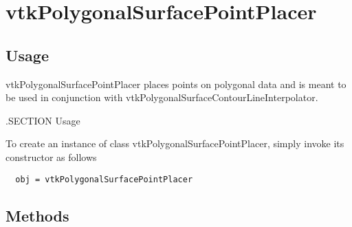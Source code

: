 \section{vtkPolygonalSurfacePointPlacer}

\subsection{Usage}

 vtkPolygonalSurfacePointPlacer places points on polygonal data and is
 meant to be used in conjunction with 
 vtkPolygonalSurfaceContourLineInterpolator.

 .SECTION Usage


To create an instance of class vtkPolygonalSurfacePointPlacer, simply
invoke its constructor as follows
\begin{verbatim}
  obj = vtkPolygonalSurfacePointPlacer
\end{verbatim}
\subsection{Methods}

